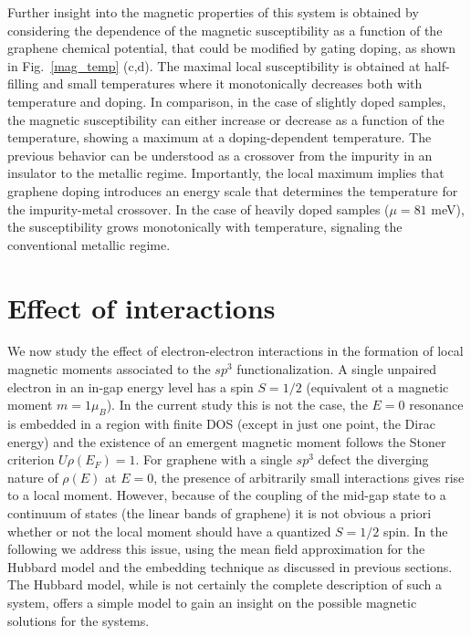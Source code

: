 Further insight into the magnetic properties of this system is obtained by considering the dependence of the magnetic susceptibility as a function of the graphene chemical potential, that could be modified by gating doping,\cite{Nair2013} as shown in Fig.~\ref{mag_temp} (c,d).
The maximal local susceptibility is obtained at half-filling and small temperatures where it monotonically decreases both with temperature and doping.
In comparison, in the case of slightly doped samples, the magnetic
susceptibility can either increase or decrease as a function of the
temperature, showing a maximum at a doping-dependent temperature. The previous
behavior can be understood as a crossover from the impurity in an insulator to
the metallic regime.
Importantly, the local maximum implies that graphene doping introduces an energy
scale that determines the temperature for the impurity-metal crossover. In the
case of heavily doped samples ($\mu = 81$ meV),
the susceptibility grows monotonically with temperature,
signaling the conventional metallic regime.



\section{Effect of interactions}
\label{sec:MF}
We now study the effect of electron-electron interactions in the formation of local magnetic moments associated to the $sp^3$ functionalization. A single unpaired electron in an in-gap energy level has a spin $S=1/2$ (equivalent ot a magnetic moment $m=1\mu_B$). In the current study this is not the case, the $E=0$ resonance is embedded in a region with finite DOS (except in just one point, the Dirac energy) and the existence of an emergent magnetic moment follows the Stoner criterion $U\rho(E_F)=1$. For graphene with a single $sp^3$ defect the diverging nature of $\rho(E)$ at $E=0$, the presence of arbitrarily small interactions gives rise to a local moment.
However, because of the coupling of the mid-gap state to a continuum of states (the linear bands of graphene) it is not obvious a priori whether or not the local moment should have a quantized $S=1/2$ spin.
In the following we address this issue, using the mean field approximation for the Hubbard model and the embedding technique as discussed in previous sections. The Hubbard model, while is not certainly the complete description of such a system, offers a simple model to gain an insight on the possible magnetic solutions for the systems.


